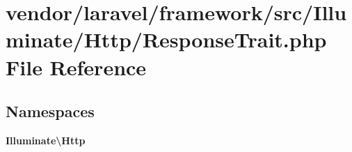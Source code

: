 \section{vendor/laravel/framework/src/\+Illuminate/\+Http/\+Response\+Trait.php File Reference}
\label{_response_trait_8php}
\subsection*{Namespaces}
\begin{DoxyCompactItemize}
\item 
 {\bf Illuminate\textbackslash{}\+Http}
\end{DoxyCompactItemize}
